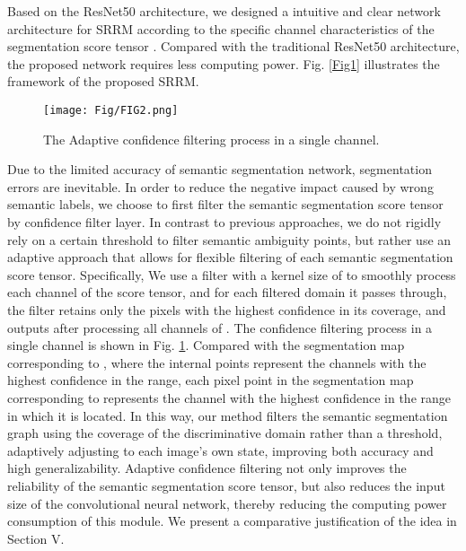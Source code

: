 \documentclass[conference]{IEEEtran}
\begin{document}
Based on the ResNet50 architecture, we designed a intuitive and clear network architecture for SRRM according to the specific channel characteristics of the segmentation score tensor . Compared with the traditional ResNet50 architecture, the proposed network requires less computing power. Fig. \ref{Fig1} illustrates the framework of the proposed SRRM.

\begin{figure}[hbp]
    \centering
    \texttt{[image: Fig/FIG2.png]}
    \caption{The Adaptive confidence filtering process in a single channel.}
    \label{Fig2}
\end{figure}

Due to the limited accuracy of semantic segmentation network, segmentation errors are inevitable. In order to reduce the negative impact caused by wrong semantic labels, we choose to first filter the semantic segmentation score tensor by confidence filter layer. In contrast to previous approaches, we do not rigidly rely on a certain threshold to filter semantic ambiguity points, but rather use an adaptive approach that allows for flexible filtering of each semantic segmentation score tensor. Specifically, We use a filter with a kernel size of  to smoothly process each channel of the score tensor, and for each filtered domain it passes through, the filter retains only the pixels with the highest confidence in its coverage, and outputs  after processing all channels of . The confidence filtering process in a single channel is shown in Fig. \ref{Fig2}. Compared with the segmentation map corresponding to , where the internal points represent the channels with the highest confidence in the  range, each pixel point in the segmentation map corresponding to  represents the channel with the highest confidence in the  range in which it is located. In this way, our method filters the semantic segmentation graph using the coverage of the discriminative domain rather than a threshold, adaptively adjusting to each image's own state, improving both accuracy and high generalizability. Adaptive confidence filtering not only improves the reliability of the semantic segmentation score tensor, but also reduces the input size of the convolutional neural network, thereby reducing the computing power consumption of this module. We present a comparative justification of the idea in Section V.
\end{document}
